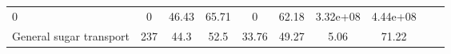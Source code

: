 \documentclass[]{article}
\begin{document}
\begin{longtable}[]{@{}lccccccccc@{}}
\begin{minipage}[t]{0.08\columnwidth}
0\strut
\end{minipage} & \begin{minipage}[t]{0.08\columnwidth}\centering\strut
0\strut
\end{minipage} & \begin{minipage}[t]{0.08\columnwidth}\centering\strut
46.43\strut
\end{minipage} & \begin{minipage}[t]{0.08\columnwidth}\centering\strut
65.71\strut
\end{minipage} & \begin{minipage}[t]{0.08\columnwidth}\centering\strut
0\strut
\end{minipage} & \begin{minipage}[t]{0.08\columnwidth}\centering\strut
62.18\strut
\end{minipage} & \begin{minipage}[t]{0.08\columnwidth}\centering\strut
3.32e+08\strut
\end{minipage} & \begin{minipage}[t]{0.08\columnwidth}\centering\strut
4.44e+08\strut
\end{minipage}\tabularnewline
\begin{minipage}[t]{0.07\columnwidth}\raggedright\strut
General sugar transport\strut
\end{minipage} & \begin{minipage}[t]{0.06\columnwidth}\centering\strut
237\strut
\end{minipage} & \begin{minipage}[t]{0.08\columnwidth}\centering\strut
44.3\strut
\end{minipage} & \begin{minipage}[t]{0.08\columnwidth}\centering\strut
52.5\strut
\end{minipage} & \begin{minipage}[t]{0.08\columnwidth}\centering\strut
33.76\strut
\end{minipage} & \begin{minipage}[t]{0.08\columnwidth}\centering\strut
49.27\strut
\end{minipage} & \begin{minipage}[t]{0.08\columnwidth}\centering\strut
5.06\strut
\end{minipage} & \begin{minipage}[t]{0.08\columnwidth}\centering\strut
71.22\strut
\end{minipage} & \begin{minipage}[t]{0.08\columnwidth}\centering\strut

\end{minipage}
\end{longtable}
\end{document}
